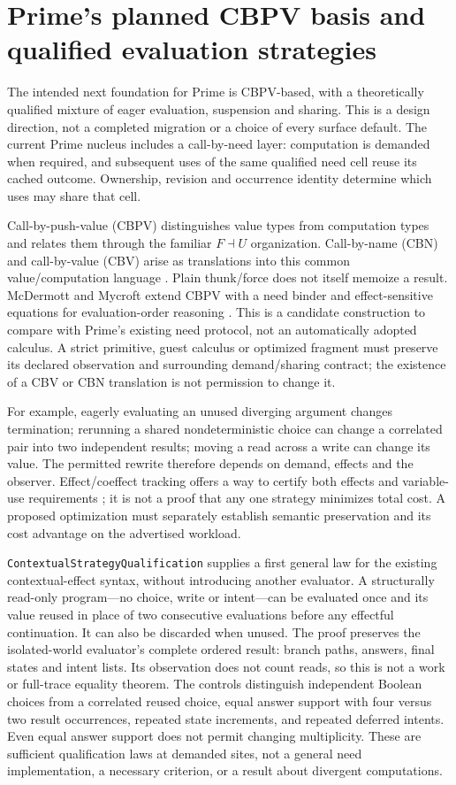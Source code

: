 \documentclass[11pt]{article}
\theoremstyle{definition}
\theoremstyle{remark}
\begin{document}
\section{Prime's planned CBPV basis and qualified evaluation strategies}

The intended next foundation for Prime is CBPV-based, with a theoretically
qualified mixture of eager evaluation, suspension and sharing. This is a
design direction, not a completed migration or a choice of every surface
default. The current Prime nucleus includes a call-by-need layer: computation
is demanded when required, and subsequent uses of the same qualified need
cell reuse its cached outcome. Ownership, revision and occurrence identity
determine which uses may share that cell.

Call-by-push-value (CBPV) distinguishes value types from computation types and
relates them through the familiar $F\dashv U$ organization. Call-by-name (CBN)
and call-by-value (CBV) arise as translations into this common
value/computation language \cite{LevyCBPV}. Plain thunk/force does not itself
memoize a result. McDermott and Mycroft extend CBPV with a need binder and
effect-sensitive equations for evaluation-order reasoning
\cite{McDermottMycroftExtendedCBPV}. This is a candidate construction to
compare with Prime's existing need protocol, not an automatically adopted
calculus. A strict primitive, guest calculus or optimized fragment must
preserve its declared observation and surrounding demand/sharing contract;
the existence of a CBV or CBN translation is not permission to change it.

For example, eagerly evaluating an unused diverging argument changes
termination; rerunning a shared nondeterministic choice can change a correlated
pair into two independent results; moving a read across a write can change
its value. The permitted rewrite therefore depends on demand, effects and
the observer. Effect/coeffect tracking offers a way to certify both effects
and variable-use requirements \cite{TorczonEffectsCoeffects}; it is not a
proof that any one strategy minimizes total cost. A proposed optimization
must separately establish semantic preservation and its cost advantage on
the advertised workload.

\nolinkurl{ContextualStrategyQualification} supplies a first general law for
the existing contextual-effect syntax, without introducing another evaluator.
A structurally read-only program---no choice, write or intent---can be
evaluated once and its value reused in place of two consecutive evaluations
before any effectful continuation. It can also be discarded when unused.
The proof preserves the isolated-world evaluator's complete ordered result:
branch paths, answers, final states and intent lists. Its observation does
not count reads, so this is not a work or full-trace equality theorem.
The controls distinguish independent Boolean choices from a correlated reused
choice, equal answer support with four versus two result occurrences, repeated
state increments, and repeated deferred intents. Even equal answer support
does not permit changing multiplicity. These are sufficient qualification
laws at demanded sites, not a general need implementation, a necessary
criterion, or a result about divergent computations.
\end{document}
